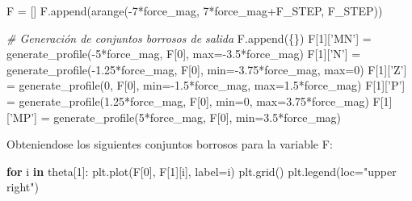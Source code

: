 \documentclass[onecolumn]{article}
\newenvironment{Shaded}{}{}
\newcommand{\BuiltInTok}[1]{#1}
\newcommand{\CommentTok}[1]{\textcolor[rgb]{0.38,0.63,0.69}{\textit{#1}}}
\newcommand{\ControlFlowTok}[1]{\textcolor[rgb]{0.00,0.44,0.13}{\textbf{#1}}}
\newcommand{\DecValTok}[1]{\textcolor[rgb]{0.25,0.63,0.44}{#1}}
\newcommand{\FloatTok}[1]{\textcolor[rgb]{0.25,0.63,0.44}{#1}}
\newcommand{\KeywordTok}[1]{\textcolor[rgb]{0.00,0.44,0.13}{\textbf{#1}}}
\newcommand{\NormalTok}[1]{#1}
\newcommand{\OperatorTok}[1]{\textcolor[rgb]{0.40,0.40,0.40}{#1}}
\newcommand{\StringTok}[1]{\textcolor[rgb]{0.25,0.44,0.63}{#1}}
\begin{document}
\begin{Shaded}
\begin{Highlighting}[]
\NormalTok{F }\OperatorTok{=}\NormalTok{ []}
\NormalTok{F.append(arange(}\OperatorTok{-}\DecValTok{7}\OperatorTok{*}\NormalTok{force_mag, }\DecValTok{7}\OperatorTok{*}\NormalTok{force_mag}\OperatorTok{+}\NormalTok{F_STEP, F_STEP))}

\CommentTok{# Generación de conjuntos borrosos de salida}
\NormalTok{F.append(\{\})}
\NormalTok{F[}\DecValTok{1}\NormalTok{][}\StringTok{'MN'}\NormalTok{] }\OperatorTok{=}\NormalTok{ generate_profile(}\OperatorTok{-}\DecValTok{5}\OperatorTok{*}\NormalTok{force_mag, F[}\DecValTok{0}\NormalTok{], }\BuiltInTok{max}\OperatorTok{=-}\FloatTok{3.5}\OperatorTok{*}\NormalTok{force_mag)}
\NormalTok{F[}\DecValTok{1}\NormalTok{][}\StringTok{'N'}\NormalTok{] }\OperatorTok{=}\NormalTok{ generate_profile(}\OperatorTok{-}\FloatTok{1.25}\OperatorTok{*}\NormalTok{force_mag, F[}\DecValTok{0}\NormalTok{], }\BuiltInTok{min}\OperatorTok{=-}\FloatTok{3.75}\OperatorTok{*}\NormalTok{force_mag, }\BuiltInTok{max}\OperatorTok{=}\DecValTok{0}\NormalTok{)}
\NormalTok{F[}\DecValTok{1}\NormalTok{][}\StringTok{'Z'}\NormalTok{] }\OperatorTok{=}\NormalTok{ generate_profile(}\DecValTok{0}\NormalTok{, F[}\DecValTok{0}\NormalTok{], }\BuiltInTok{min}\OperatorTok{=-}\FloatTok{1.5}\OperatorTok{*}\NormalTok{force_mag, }\BuiltInTok{max}\OperatorTok{=}\FloatTok{1.5}\OperatorTok{*}\NormalTok{force_mag)}
\NormalTok{F[}\DecValTok{1}\NormalTok{][}\StringTok{'P'}\NormalTok{] }\OperatorTok{=}\NormalTok{ generate_profile(}\FloatTok{1.25}\OperatorTok{*}\NormalTok{force_mag, F[}\DecValTok{0}\NormalTok{], }\BuiltInTok{min}\OperatorTok{=}\DecValTok{0}\NormalTok{, }\BuiltInTok{max}\OperatorTok{=}\FloatTok{3.75}\OperatorTok{*}\NormalTok{force_mag)}
\NormalTok{F[}\DecValTok{1}\NormalTok{][}\StringTok{'MP'}\NormalTok{] }\OperatorTok{=}\NormalTok{ generate_profile(}\DecValTok{5}\OperatorTok{*}\NormalTok{force_mag, F[}\DecValTok{0}\NormalTok{], }\BuiltInTok{min}\OperatorTok{=}\FloatTok{3.5}\OperatorTok{*}\NormalTok{force_mag)}
\end{Highlighting}
\end{Shaded}

Obteniendose los siguientes conjuntos borrosos para la variable F:

\begin{Shaded}
\begin{Highlighting}[]
\ControlFlowTok{for}\NormalTok{ i }\KeywordTok{in}\NormalTok{ theta[}\DecValTok{1}\NormalTok{]:}
\NormalTok{    plt.plot(F[}\DecValTok{0}\NormalTok{], F[}\DecValTok{1}\NormalTok{][i], label}\OperatorTok{=}\NormalTok{i)}
\NormalTok{plt.grid()}
\NormalTok{plt.legend(loc}\OperatorTok{=}\StringTok{"upper right"}\NormalTok{)}
\end{Highlighting}
\end{Shaded}
\end{document}

